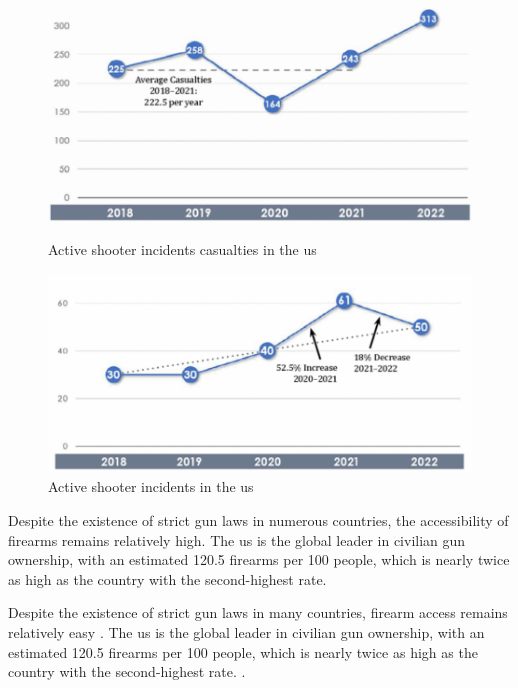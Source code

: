 \begin{figure}[h]
    \centering
    \begin{minipage}{0.42\textwidth}
        \centering
        \includegraphics[width=1\linewidth]{figs/active-shooter-incidents.png}
        \caption{Active shooter incidents casualties in the \ac{us} \cite{rfc37}}
        \label{fig:casualties}
    \end{minipage}\hfill
    \begin{minipage}{0.45\textwidth}
        \centering
        \includegraphics[width=1\linewidth]{figs/active-shooter-us.png}
        \caption{Active shooter incidents in the \ac{us} \cite{rfc37}}
        \label{fig:incidents}
    \end{minipage}
\end{figure}

Despite the existence of strict gun laws in numerous countries, the accessibility of firearms remains relatively 
high. The \ac{us} is the global leader in civilian gun ownership, with an estimated 120.5 firearms per 100 
people, which is nearly twice as high as the country with the second-highest rate.

Despite the existence of strict gun laws in many countries, firearm access remains relatively 
easy \cite{rfc39, rfc40}. The \ac{us} is the global leader in civilian gun 
ownership, with an estimated 120.5 firearms per 100 
people, which is nearly twice as high as the country with the second-highest rate.
\cite{rfc32}.


